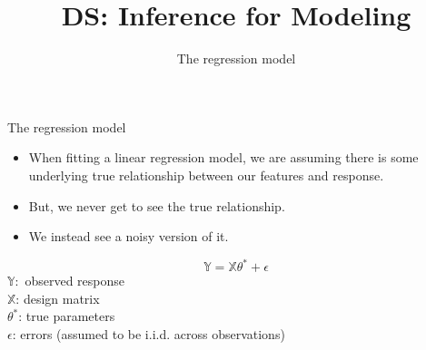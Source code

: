 \documentclass[aspectratio=169]{../latex_main/tntbeamer}  %
\title[Introduction]{DS: Inference for Modeling}
\subtitle{The regression model}
\begin{document}
	
	\maketitle
	\begin{frame}{The regression model}
	    \begin{itemize}
	        \item When fitting a linear regression model, we are assuming there is some underlying true relationship between our features and response.
	        \item But, we never get to see the true relationship.
	        \item We instead see a noisy version of it.
	    \end{itemize}
	    \begin{equation*}
	        \mathbb{Y} = \mathbb{X}\theta^* + \epsilon
	    \end{equation*}
	    $\mathbb{Y}:$ observed response\\
	    $\mathbb{X}$: design matrix\\
	    $\theta^*$: true parameters\\
	    $\epsilon$: errors (assumed to be i.i.d. across observations)
	\end{frame}
	
\end{document}
